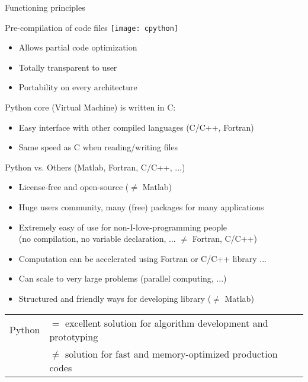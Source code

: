 \documentclass[11pt,unknownkeysallowed,usenames,dvipsnames]{beamer}
\begin{document}
	\begin{frame}{Functioning principles}
        \begin{block}{Pre-compilation of code files}
            \centering
            \texttt{[image: cpython]}
            
            \vspace*{-20pt}   
            \begin{itemize}
                \item Allows partial code optimization
                \item Totally transparent to user
                \item Portability on every architecture
            \end{itemize}
        \end{block}
        Python core (Virtual Machine) is written in C:
        
        \vspace*{-5pt}
        \begin{itemize}
            \item Easy interface with other compiled languages (C/C++, Fortran)
            \item Same speed as C when reading/writing files
        \end{itemize}
        
        \vspace*{-20pt}
    \end{frame}

	\begin{frame}{Python vs. Others (Matlab, Fortran, C/C++, ...)}
        \begin{itemize}
            \item License-free and open-source ($\neq$ Matlab)
            \item Huge users community, many (free) packages for many applications
            \item Extremely easy of use for non-I-love-programming people \\ (no compilation, no variable declaration, ... $\neq$ Fortran, C/C++)
            \item Computation can be accelerated using Fortran or C/C++
            library ... 
            \item Can scale to very large problems (parallel computing, ...)
            \item Structured and friendly ways for developing library ($\neq$ Matlab)
        \end{itemize}
		\begin{tabular}{rl}
			Python&$=$ excellent solution for algorithm development and prototyping\\
			&$\neq$ solution for fast and memory-optimized production codes
		\end{tabular}
	\end{frame}
\end{document}
